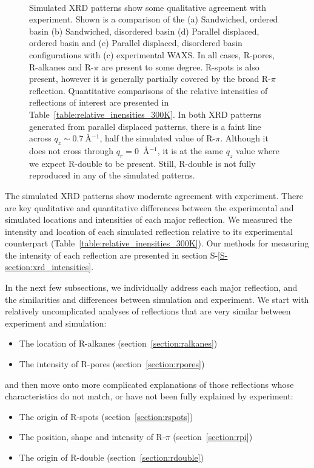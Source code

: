 \documentclass[journal=jpcbfk,manuscript=article]{achemso}
\begin{document}
\begin{figure}[!htb]
\begin{subfigure}{0.1\textwidth}
	\end{subfigure}	
	\caption{Simulated XRD patterns show some qualitative agreement with experiment. Shown is a 
	comparison of the (a) Sandwiched, ordered basin (b) Sandwiched,
	disordered basin (d) Parallel displaced, ordered basin and (e) Parallel displaced, disordered basin 
	configurations with (c) experimental WAXS. 	In all cases, R-pores, R-alkanes and R-$\pi$ are 
	present to some degree. R-spots is also present, however it is generally partially covered by the
	broad R-$\pi$ reflection. Quantitative comparisons of the relative intensities of reflections of
	interest are presented in Table~\ref{table:relative_inensities_300K}. In both XRD patterns generated
	from parallel displaced patterns, there is a faint line across $q_z \sim 0.7~$\AA$^{-1}$, half
	the simulated value of R-$\pi$. Although it does not cross through $q_r = 0$~\AA$^{-1}$, it is at 
	the same $q_z$ value where we expect R-double to be present. Still, R-double is not fully reproduced
	in any of the simulated patterns.}~\label{fig:XRDsim} 
  \end{figure}
  
  The simulated XRD patterns show moderate agreement with experiment. There 
  are key qualitative and quantitative differences between the experimental and simulated
  locations and intensities of each major reflection. We measured the intensity and location
  of each simulated reflection relative to its experimental counterpart 
  (Table~\ref{table:relative_inensities_300K}). Our methods for measuring the intensity of
  each reflection are presented in section S-\ref{S-section:xrd_intensities}. 

  In the next few subsections, we individually address each major reflection, and the
  similarities and differences between simulation and experiment. We start with relatively 
  uncomplicated analyses of reflections that are very similar between experiment and simulation:
  \begin{itemize}
  	\item The location of R-alkanes (section~\ref{section:ralkanes})
  	\item The intensity of R-pores (section~\ref{section:rpores})
  \end{itemize}
  and then move onto more complicated explanations of those reflections whose characteristics
  do not match, or have not been fully explained by experiment:
  \begin{itemize}
  	\item The origin of R-spots (section~\ref{section:rspots})
  	\item The position, shape and intensity of R-$\pi$ (section~\ref{section:rpi})
  	\item The origin of R-double (section~\ref{section:rdouble})
  \end{itemize}
  
\end{document}
